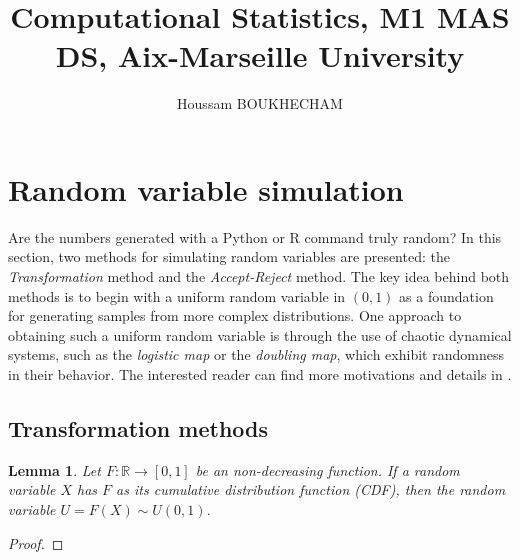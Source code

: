 \documentclass{article}\usepackage[]{graphicx}\usepackage[]{xcolor}
\title{Computational Statistics, M1 MAS DS, Aix-Marseille University}
\author{Houssam BOUKHECHAM}
\newtheorem{lemma}{Lemma}
\begin{document}
\maketitle
\tableofcontents


\newpage
\section{Random variable simulation}
Are the numbers generated with a Python or R command truly random? In this section, two methods for simulating random variables are presented: the \textit{Transformation} method and the \textit{Accept-Reject} method.  
The key idea behind both methods is to begin with a uniform random variable in $(0,1)$ as a foundation for generating samples from more complex distributions. One approach to obtaining such a uniform random variable is through the use of chaotic dynamical systems, such as the \textit{logistic map} or the \textit{doubling map}, which exhibit randomness in their behavior. The interested reader can find more motivations and details in \cite{RobertCasela1999MonteCarloSM}.



\subsection{Transformation methods}

\begin{lemma}
  Let $F:\mathbb{R} \to [0,1]$ be an non-decreasing function. 
  If a random variable $X$ has $F$ as its cumulative distribution function (CDF), then the random variable $U = F(X) \sim U(0,1)$.
\end{lemma}
  
\begin{proof}
\end{proof}
\end{document}
